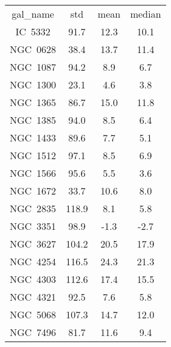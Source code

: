 \begin{table}
\begin{tabular}{cccc}
gal_name & std & mean & median \\
IC~5332 & 91.7 & 12.3 & 10.1 \\
NGC~0628 & 38.4 & 13.7 & 11.4 \\
NGC~1087 & 94.2 & 8.9 & 6.7 \\
NGC~1300 & 23.1 & 4.6 & 3.8 \\
NGC~1365 & 86.7 & 15.0 & 11.8 \\
NGC~1385 & 94.0 & 8.5 & 6.4 \\
NGC~1433 & 89.6 & 7.7 & 5.1 \\
NGC~1512 & 97.1 & 8.5 & 6.9 \\
NGC~1566 & 95.6 & 5.5 & 3.6 \\
NGC~1672 & 33.7 & 10.6 & 8.0 \\
NGC~2835 & 118.9 & 8.1 & 5.8 \\
NGC~3351 & 98.9 & -1.3 & -2.7 \\
NGC~3627 & 104.2 & 20.5 & 17.9 \\
NGC~4254 & 116.5 & 24.3 & 21.3 \\
NGC~4303 & 112.6 & 17.4 & 15.5 \\
NGC~4321 & 92.5 & 7.6 & 5.8 \\
NGC~5068 & 107.3 & 14.7 & 12.0 \\
NGC~7496 & 81.7 & 11.6 & 9.4 \\
\end{tabular}
\end{table}
